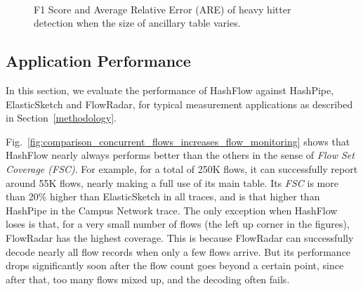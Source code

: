 \begin{figure}[ht!]
	\centering
	\mbox{
	}
	\caption{F1 Score and Average Relative Error (ARE) of heavy hitter detection when the size of ancillary table varies.}
	\label{fig:are_for_various_beta}
\end{figure}




\subsection{Application Performance }
In this section, we evaluate the performance of HashFlow against HashPipe, ElasticSketch and FlowRadar, 
for typical measurement applications as described in  Section~\ref{methodology}.

Fig.~\ref{fig:comparison_concurrent_flows_increases_flow_monitoring} shows that HashFlow nearly always performs better than the others in the sense of \emph{Flow Set Coverage (FSC)}. For example, 
for a total of 250K flows, it can successfully report around 55K flows, 
nearly making a full use of its main table. 
Its \emph{FSC} is more than 20\% higher than ElasticSketch in all traces, 
and is that higher than HashPipe in the Campus Network trace. 
The only exception when HashFlow loses is that, 
for a very small number of flows (the left up corner in the figures), 
FlowRadar has the highest coverage. 
This is because FlowRadar can successfully decode nearly all flow records when only a few flows arrive. 
But its performance drops significantly soon after the flow count goes beyond a certain point, 
since after that, too many flows mixed up, and the decoding often fails.

